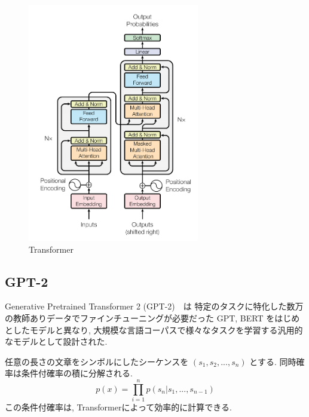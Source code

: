 \documentclass[twocolumn]{jarticle}     %
\begin{document}
\begin{figure}[tb]
  \begin{center}
    \includegraphics[clip,width=75mm]{Transformer.png}
    \caption{Transformer}
    \label{fig:trans}
  \end{center}
\end{figure}



\subsection{GPT-2}
Generative Pretrained Transformer 2 (GPT-2)\cite{radford2019language}　は
特定のタスクに特化した数万の教師ありデータでファインチューニングが必要だった GPT, BERT をはじめとしたモデルと異なり,
大規模な言語コーパスで様々なタスクを学習する汎用的なモデルとして設計された.

任意の長さの文章をシンボルにしたシーケンスを $(s_1, s_2, ..., s_n)$ とする.
同時確率は条件付確率の積に分解される.
\begin{equation}
p(x) = \prod^n_{i=1} p(s_n|s_1, ... , s_{n-1})
\end{equation}
この条件付確率は, Transformer\cite{DBLP:journals/corr/VaswaniSPUJGKP17}によって効率的に計算できる.
\end{document}
